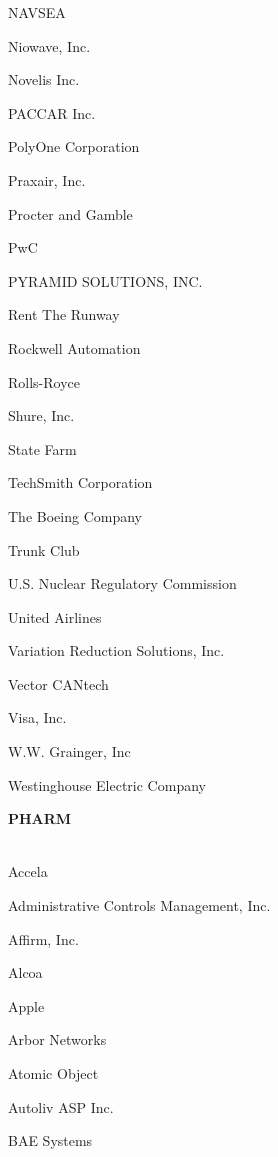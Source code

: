 \documentclass[twoside]{article}
\begin{document}
\begin{center}
\begin{multicols}{5}
\begin{FlushLeft}
\begin{compactitem}
\item NAVSEA
\item Niowave, Inc.
\item Novelis Inc.
\item PACCAR Inc.
\item PolyOne Corporation
\item Praxair, Inc.
\item Procter and Gamble
\item PwC
\item PYRAMID SOLUTIONS, INC.
\item Rent The Runway
\item Rockwell Automation
\item Rolls-Royce
\item Shure, Inc.
\item State Farm
\item TechSmith Corporation
\item The Boeing Company
\item Trunk Club
\item U.S. Nuclear Regulatory Commission
\item United Airlines
\item Variation Reduction Solutions, Inc.
\item Vector CANtech
\item Visa, Inc.
\item W.W. Grainger, Inc
\item Westinghouse Electric Company
\end{compactitem}
        \end{FlushLeft}
        \vspace{.2em}
        {\fontsize{14}{16}\selectfont \bf PHARM}\\
        \vspace{-1em}
        ~\hrulefill~
        \vspace{-.9em}
        \begin{FlushLeft}
        \begin{compactitem}
        \item Accela
\item Administrative Controls Management, Inc.
\item Affirm, Inc.
\item Alcoa
\item Apple
\item Arbor Networks
\item Atomic Object
\item Autoliv ASP Inc.
\item BAE Systems

\end{compactitem}
\end{FlushLeft}
\end{multicols}
\end{center}
\end{document}
